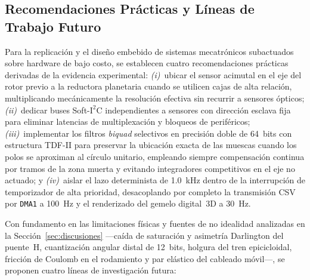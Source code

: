 \subsection{Recomendaciones Prácticas y Líneas de Trabajo Futuro}\label{subsec:recomendaciones_futuro}

Para la replicación y el diseño embebido de sistemas mecatrónicos subactuados sobre hardware de bajo costo, se establecen cuatro recomendaciones prácticas derivadas de la evidencia experimental: \textit{(i)}~ubicar el sensor acimutal en el eje del rotor previo a la reductora planetaria cuando se utilicen cajas de alta relación, multiplicando mecánicamente la resolución efectiva sin recurrir a sensores ópticos; \textit{(ii)}~dedicar buses Soft-$\text{I}^2\text{C}$ independientes a sensores con dirección esclava fija para eliminar latencias de multiplexación y bloqueos de periféricos; \textit{(iii)}~implementar los filtros \textit{biquad} selectivos en precisión doble de 64~bits con estructura TDF-II para preservar la ubicación exacta de las muescas cuando los polos se aproximan al círculo unitario, empleando siempre compensación continua por tramos de la zona muerta y evitando integradores competitivos en el eje no actuado; y \textit{(iv)}~aislar el lazo determinista de \qty{1.0}{\kilo\hertz} dentro de la interrupción de temporizador de alta prioridad, desacoplando por completo la transmisión CSV por \texttt{DMA1} a \qty{100}{\hertz} y el renderizado del gemelo digital~3D a \qty{30}{\hertz}.

Con fundamento en las limitaciones físicas y fuentes de no idealidad analizadas en la Sección~\ref{sec:discusiones} ---caída de saturación y asimetría Darlington del puente~H, cuantización angular distal de 12~bits, holgura del tren epicicloidal, fricción de Coulomb en el rodamiento y par elástico del cableado móvil---, se proponen cuatro líneas de investigación futura:

